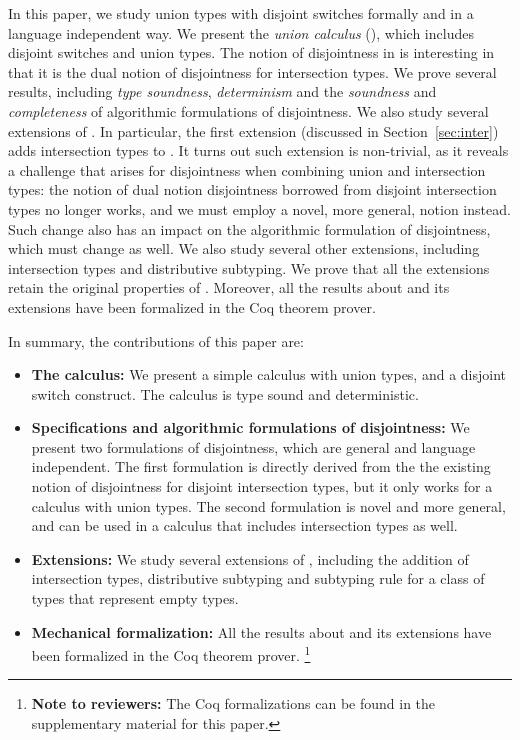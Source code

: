 In this paper, we study union types with disjoint switches formally
and in a language independent way. We present the \emph{union
  calculus} (\cal), which includes disjoint switches and union types.
The notion of disjointness in \cal is interesting in that it is
the dual notion of disjointness for intersection types.
We prove several results, including \emph{type soundness}, \emph{determinism}
and the \emph{soundness} and \emph{completeness} of algorithmic formulations
of disjointness.
We also study several extensions of \cal. In particular,
the first extension (discussed in Section~\ref{sec:inter}) adds intersection
types to \cal. It turns out such extension is non-trivial, as it reveals
a challenge that arises for disjointness when combining
union and intersection types:
the notion of dual notion disjointness borrowed from
disjoint intersection types no longer works, and we must employ
a novel, more general, notion instead. Such change also has an impact
on the algorithmic formulation of disjointness, which must change as
well. We also study several other extensions, including intersection
types and distributive subtyping. We prove that all the extensions retain
the original properties of \cal. Moreover, all the results about \cal and its
extensions have been formalized in the Coq theorem prover.

In summary, the contributions of this paper are:

\begin{itemize}
\item {\bf The \name calculus:} We present a simple calculus with union
  types, and a disjoint switch construct. The calculus is type sound and
  deterministic. 
\item {\bf Specifications and algorithmic formulations of disjointness:}
  We present two formulations of disjointness, which are general and
  language independent. The first formulation is directly derived from
  the the existing notion of disjointness for disjoint intersection types,
  but it only works for a calculus with union types. The second formulation
  is novel and more general, and can be used in a calculus that includes
  intersection types as well.
\item {\bf Extensions:} We study several extensions of \name, including the
  addition of intersection types, distributive subtyping and
  subtyping rule for a class of types that represent empty types.
\item {\bf Mechanical formalization:}
  All the results about \cal and its
  extensions have been formalized in the Coq theorem prover.
  \footnote{{\bf Note to reviewers:} The Coq formalizations can be found in the
  supplementary material for this paper.}
\end{itemize}



